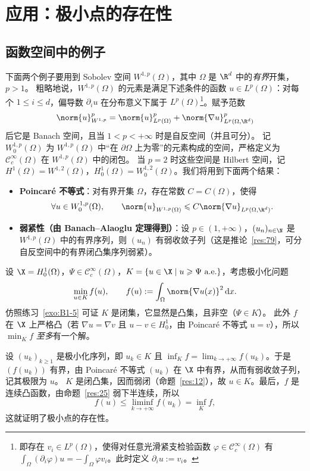 \section{应用：极小点的存在性}

\subsection*{函数空间中的例子}

下面两个例子要用到 Sobolev 空间 $W^{1,p}(\Omega)$，其中 $\Omega$ 是 $\R^d$ 中的\emph{有界}开集，$p>1$。
粗略地说，$W^{1,p}(\Omega)$ 的元素是满足下述条件的函数 $u\in L^p(\Omega)$：对每个 $1\leqslant i\leqslant d$，偏导数 $\partial_iu$ 在分布意义下属于 $L^p(\Omega)$\footnote{即存在 $v_i\in L^p(\Omega)$，使得对任意光滑紧支检验函数 $\varphi\in\mathcal{C}_c^\infty(\Omega)$ 有 $\int_\Omega(\partial_i\varphi)u=-\int_\Omega\varphi v_i$。此时定义 $\partial_iu:=v_i$。}。赋予范数
\[
  \norm{u}_{W^{1,p}}^p=\norm{u}_{L^p(\Omega)}^p+\norm{\nabla u}_{L^p(\Omega,\R^d)}^p
\]
后它是 Banach 空间，且当 $1<p<+\infty$ 时是自反空间（并且可分）。
记 $W_0^{1,p}(\Omega)$ 为 $W^{1,p}(\Omega)$ 中“在 $\partial\Omega$ 上为零”的元素构成的空间，严格定义为 $\mathcal{C}_c^\infty(\Omega)$ 在 $W^{1,p}(\Omega)$ 中的闭包。
当 $p=2$ 时这些空间是 Hilbert 空间，记 $H^1(\Omega)=W^{1,2}(\Omega)$，$H_0^1(\Omega)=W_0^{1,2}(\Omega)$。我们将用到下面两个结果：
\begin{itemize}
  \item \textbf{Poincaré 不等式}：对有界开集 $\Omega$，存在常数 $C=C(\Omega)$，使得
  \[
    \forall u\in W_0^{1,p}(\Omega),\qquad \norm{u}_{W^{1,p}(\Omega)}\leqslant C\norm{\nabla u}_{L^p(\Omega,\R^d)} .
  \]
  \item \textbf{弱紧性（由 Banach--Alaoglu 定理得到）}：设 $p\in(1,+\infty)$，$(u_n)_{n\in\N}$ 是 $W^{1,p}(\Omega)$ 中的有界序列，则 $(u_n)$ 有弱收敛子列（这是推论~\ref{res:79}，可分自反空间中的有界闭凸集序列弱紧）。
\end{itemize}

\begin{example}
\label{exa:11}
设 $\X=H_0^1(\Omega)$，$\Psi\in\mathcal{C}_c^\infty(\Omega)$，$K=\{u\in\X \mid u\geqslant\Psi\ \text{a.e.}\}$，考虑极小化问题
\[
  \min_{u\in K}f(u),\qquad f(u):=\int_\Omega\norm{\nabla u(x)}^2\,\mathrm{d}x .
\]
仿照练习~\ref{exo:B1-5} 可证 $K$ 是闭集，它显然是凸集，且非空（$\Psi\in K$）。
此外 $f$ 在 $\X$ 上严格凸（若 $\nabla u=\nabla v$ 且 $u-v\in H_0^1$，由 Poincaré 不等式 $u=v$），所以 $\min_Kf$ \emph{至多}有一个解。

设 $(u_k)_{k\geqslant1}$ 是极小化序列，即 $u_k\in K$ 且 $\inf_Kf=\lim_{k\to+\infty}f(u_k)$。于是 $(f(u_k))$ 有界，由 Poincaré 不等式 $(u_k)$ 在 $\X$ 中有界，从而有弱收敛子列，记其极限为 $u$。
$K$ 是闭凸集，因而弱闭（命题~\ref{res:12}），故 $u\in K$。最后，$f$ 是连续凸函数，由命题~\ref{res:25} 弱下半连续，所以
\[
  f(u)\leqslant\liminf_{k\to+\infty}f(u_k)=\inf_Kf ,
\]
这就证明了极小点的存在性。
\end{example}

